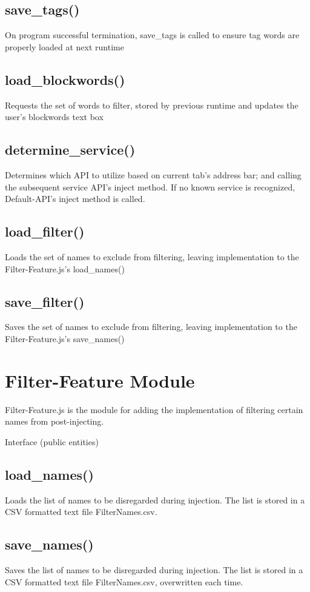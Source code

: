 \documentclass[12pt, titlepage]{article}
\begin{document}
\subsection{save\_tags()}
On program successful termination, save\_tags is called to ensure tag words are properly loaded at next runtime
\subsection{load\_blockwords()}
Requests the set of words to filter, stored by previous runtime and updates the user's blockwords text box
\subsection{determine\_service()}
Determines which API to utilize based on current tab's address bar; and calling the subsequent service API's inject method. If no known service is recognized, Default-API's inject method is called.
\subsection{load\_filter()}
Loads the set of names to exclude from filtering, leaving implementation to the Filter-Feature.js's load\_names()
\subsection{save\_filter()}
Saves the set of names to exclude from filtering, leaving implementation to the Filter-Feature.js's save\_names()


\section{Filter-Feature Module}
Filter-Feature.js is the module for adding the implementation of filtering certain names from post-injecting. 

Interface (public entities)
\subsection{load\_names()}
Loads the list of names to  be disregarded during injection. The list is stored in a CSV formatted text file FilterNames.csv.
\subsection{save\_names()}
Saves the list of names to  be disregarded during injection. The list is stored in a CSV formatted text file FilterNames.csv, overwritten each time.
\end{document}

